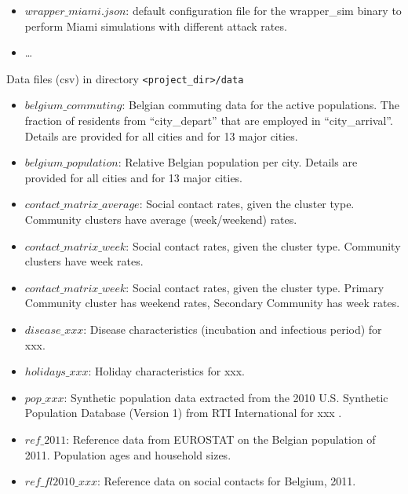 \begin{compactitem}
\begin{itemize}
		\item $wrapper\_miami.json$: default configuration file for the wrapper\_sim binary to perform Miami simulations with different attack rates.
        \item \ldots
        \end{itemize}
    \item Data files (csv)
      	in directory \texttt{<project\_dir>/data}
      	\begin{itemize}
        \item $belgium\_commuting$: Belgian commuting data for the active populations. The fraction of residents from ``city\_depart'' that are employed in ``city\_arrival''. Details are provided for all cities and for 13 major cities.
		\item $belgium\_population$: Relative Belgian population per city. Details are provided for all cities and for 13 major cities.
		\item $contact\_matrix\_average$: Social contact rates, given the cluster type. Community clusters have average (week/weekend) rates.
		\item $contact\_matrix\_week$: Social contact rates, given the cluster type. Community clusters have week rates.
		\item $contact\_matrix\_week$: Social contact rates, given the cluster type. Primary Community cluster has weekend rates, Secondary Community has week rates.
		\item $disease\_xxx$: Disease characteristics (incubation and infectious period) for xxx.
		\item $holidays\_xxx$: Holiday characteristics for xxx.
		\item $pop\_xxx$: Synthetic population data extracted from the 2010 U.S. Synthetic Population Database (Version 1) from RTI International for xxx \cite{wheaton2014a,wheaton2014b}. 
		\item $ref\_2011$: Reference data from EUROSTAT on the Belgian population of 2011. Population ages and household sizes.
		\item $ref\_fl2010\_xxx$: Reference data on social contacts for Belgium, 2011. 


\end{itemize}
\end{compactitem}
